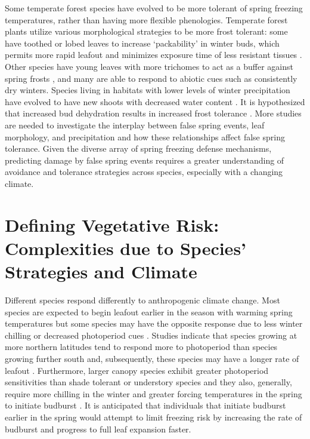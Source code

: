 \documentclass{article}\usepackage[]{graphicx}\usepackage[]{color}
\begin{document}
Some temperate forest species have evolved to be more tolerant of spring freezing temperatures, rather than having more flexible phenologies. Temperate forest plants utilize various morphological strategies to be more frost tolerant: some have toothed or lobed leaves to increase `packability' in winter buds, which permits more rapid leafout and minimizes exposure time of less resistant tissues \citep{Edwards2017}. Other species have young leaves with more trichomes to act as a buffer against spring frosts \citep{Agrawal2004}, and many are able to respond to abiotic cues such as consistently dry winters. Species living in habitats with lower levels of winter precipitation have evolved to have new shoots with decreased water content \citep{Morin2007, Hofmann2015}. It is hypothesized that increased bud dehydration results in increased frost tolerance \citep{Beck2007, Nielsen2009, Poirier2010, Kathke2011, Hofmann2015}. More studies are needed to investigate the interplay between false spring events, leaf morphology, and precipitation and how these relationships affect false spring tolerance. Given the diverse array of spring freezing defense mechanisms, predicting damage by false spring events requires a greater understanding of avoidance and tolerance strategies across species, especially with a changing climate.

\section {Defining Vegetative Risk: Complexities due to Species' Strategies and Climate}
Different species respond differently to anthropogenic climate change. Most species are expected to begin leafout earlier in the season with warming spring temperatures but some species may have the opposite response due to less winter chilling or decreased photoperiod cues \citep{Cleland2006, Yu2010, Xin2016}. Studies indicate that species growing at more northern latitudes tend to respond more to photoperiod than species growing further south and, subsequently, these species may have a longer rate of leafout \citep {Partanen2004, Viheraaarnio2006, Caffarra2011}. Furthermore, larger canopy species exhibit greater photoperiod sensitivities than shade tolerant or understory species \citep{Basler2012} and they also, generally, require more chilling in the winter and greater forcing temperatures in the spring to initiate budburst \citep{Laube2013}. It is anticipated that individuals that initiate budburst earlier in the spring would attempt to limit freezing risk by increasing the rate of budburst and progress to full leaf expansion faster.
\end{document}
